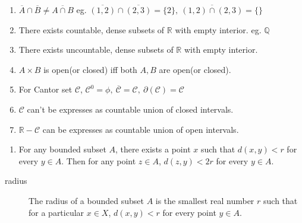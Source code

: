 	\begin{remark}
		\begin{enumerate}
			\item $\overline{A} \cap \overline{B} \ne \overline{A \cap B}$ eg. $\overline{(1,2)} \cap \overline{(2,3)} = \{ 2 \},\ \overline{(1,2)\cap(2,3)} = \{ \}$
			\item There exists countable, dense subsets of $\mathbb{R}$ with empty interior. eg. $\mathbb{Q}$
			\item There exists uncountable, dense subsets of $\mathbb{R}$ with empty interior.
			\item $A \times B$ is open(or closed) iff both $A,B$ are open(or closed).
			\item For Cantor set $\mathcal{C}$, $\mathcal{C}^0 = \phi,\ \overline{\mathcal{C}} = \mathcal{C},\ \partial(\mathcal{C}) = \mathcal{C}$
			\item $\mathcal{C}$ can't be expresses as countable union of closed intervals.
			\item $\mathbb{R}-\mathcal{C}$ can be expresses as countable union of open intervals.
		\end{enumerate}
	\end{remark}
	\begin{remark}
		\begin{enumerate}
			\item For any bounded subset $A$, there exists a point $x$ such that $d(x,y) < r$ for every $y \in A$. Then for any point $z \in A$, $d(z,y) < 2r$ for every $y \in A$.
		\end{enumerate}
	\end{remark}
	\begin{definition}
		\begin{description}
			\item[radius] The radius of a bounded subset $A$ is the smallest real number $r$ such that for a particular $x \in X$, $d(x,y) < r$ for every point $y \in A$.
		\end{description}
	\end{definition}
